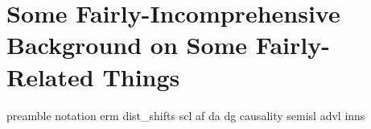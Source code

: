 \chapter{Some Fairly-Incomprehensive Background on Some Fairly-Related Things}\label{ch:background}
{preamble}
{notation}
{erm}
{dist_shifts}
{scl}
{af}
{da}
{dg}
{causality}
{semisl}
{advl}
{inns}

